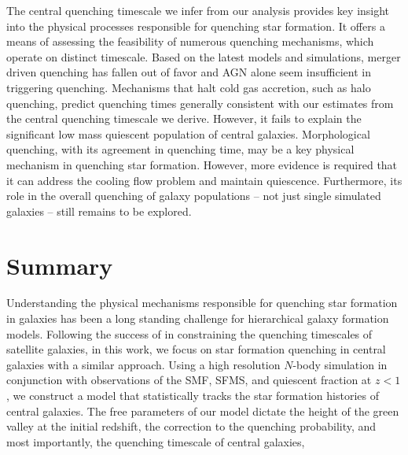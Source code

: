 \documentclass[iop,apj,tighten,twocolappendix,numberedappendix]{emulateapj}
\begin{document}
The central quenching timescale we infer from our analysis provides key insight
into the physical processes responsible for quenching star formation. It offers 
a means of assessing the feasibility of numerous quenching mechanisms, which
operate on distinct timescale. Based on the latest models and simulations, 
merger driven quenching has fallen out of favor 
and AGN alone seem insufficient in triggering quenching. 
Mechanisms that halt cold gas accretion, such as halo quenching, predict 
quenching times generally consistent with our estimates from the central 
quenching timescale we derive. However, it fails to explain the significant 
low mass quiescent population of central galaxies. Morphological quenching, 
with its agreement in quenching time, may be a key physical mechanism 
in quenching star formation. However, more evidence is required that it 
can address the cooling flow problem and maintain quiescence. Furthermore, 
its role in the overall quenching of galaxy populations -- not just 
single simulated galaxies -- still remains to be explored.  

\section{Summary} \label{sec:summary}
Understanding the physical mechanisms responsible for quenching 
star formation in galaxies has been a long standing challenge 
for hierarchical galaxy formation models. Following the success 
of \cite{Wetzel:2013aa} in constraining the quenching timescales 
of satellite galaxies, in this work, we focus on star formation 
quenching in central galaxies with a similar approach. 
Using a high resolution $N$-body simulation in conjunction with 
observations of the SMF, SFMS, and quiescent fraction at $z < 1$, 
we construct a model that statistically tracks the star formation 
histories of central galaxies. The free parameters of our model 
dictate the height  of the green valley at the initial redshift, 
the correction to the quenching probability, and most importantly,
the quenching timescale of central galaxies, 
\end{document}

